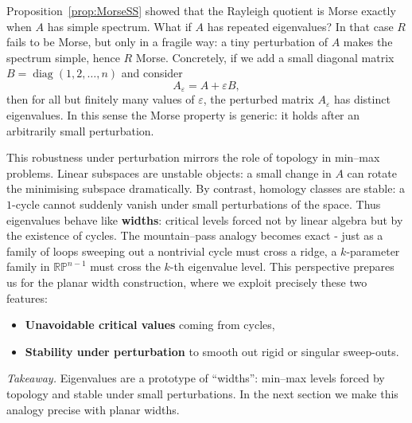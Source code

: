 \begin{remark}
Proposition~\ref{prop:MorseSS} showed that the Rayleigh quotient is Morse exactly when $A$ has simple spectrum. What if $A$ has repeated eigenvalues?  
In that case $R$ fails to be Morse, but only in a fragile way: a tiny perturbation of $A$ makes the spectrum simple, hence $R$ Morse. Concretely, if we add a small diagonal matrix $B=\operatorname{diag}(1,2,\dots,n)$ and consider
\[
   A_\varepsilon = A + \varepsilon B ,
\]
then for all but finitely many values of $\varepsilon$, the perturbed matrix $A_\varepsilon$ has distinct eigenvalues. In this sense the Morse property is generic: it holds after an arbitrarily small perturbation.
\end{remark}

\begin{remark}
This robustness under perturbation mirrors the role of topology in min–max problems.  
Linear subspaces are unstable objects: a small change in $A$ can rotate the minimising subspace dramatically. By contrast, homology classes are stable: a $1$-cycle cannot suddenly vanish under small perturbations of the space.  
Thus eigenvalues behave like \textbf{widths}: critical levels forced not by linear algebra but by the existence of cycles. The mountain–pass analogy becomes exact - just as a family of loops sweeping out a nontrivial cycle must cross a ridge, a $k$-parameter family in $\mathbb{RP}^{n-1}$ must cross the $k$-th eigenvalue level.  
This perspective prepares us for the planar width construction, where we exploit precisely these two features:  
\begin{itemize}
    \item \textbf{Unavoidable critical values} coming from cycles,  
    \item \textbf{Stability under perturbation} to smooth out rigid or singular sweep-outs.  
\end{itemize}
\noindent\emph{Takeaway.} Eigenvalues are a prototype of “widths”: min--max levels forced by topology and stable under small perturbations. In the next section we make this analogy precise with planar widths.
\end{remark}


